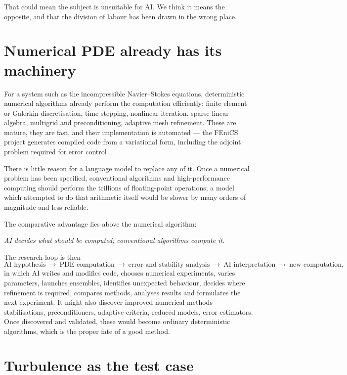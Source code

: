 \documentclass[11pt]{article}
\begin{document}
That could mean the subject is unsuitable for AI. We think it means the opposite, and that the
division of labour has been drawn in the wrong place.

\section{Numerical PDE already has its machinery}\label{sec:machinery}

For a system such as the incompressible Navier--Stokes equations, deterministic numerical algorithms
already perform the computation efficiently: finite element or Galerkin discretisation, time
stepping, nonlinear iteration, sparse linear algebra, multigrid and preconditioning, adaptive mesh
refinement. These are mature, they are fast, and their implementation is automated --- the FEniCS
project generates compiled code from a variational form, including the adjoint problem required for
error control~\cite{fenics}.

There is little reason for a language model to replace any of it. Once a numerical problem has been
specified, conventional algorithms and high-performance computing should perform the trillions of
floating-point operations; a model which attempted to do that arithmetic itself would be slower by
many orders of magnitude and less reliable.

The comparative advantage lies above the numerical algorithm:

\begin{center}
\emph{AI decides what should be computed; conventional algorithms compute it.}
\end{center}

\noindent The research loop is then
\[
\text{AI hypothesis}\ \rightarrow\ \text{PDE computation}\ \rightarrow\ \text{error and stability
analysis}\ \rightarrow\ \text{AI interpretation}\ \rightarrow\ \text{new computation},
\]
in which AI writes and modifies code, chooses numerical experiments, varies parameters, launches
ensembles, identifies unexpected behaviour, decides where refinement is required, compares methods,
analyses results and formulates the next experiment. It might also discover improved numerical
methods --- stabilisations, preconditioners, adaptive criteria, reduced models, error estimators.
Once discovered and validated, these would become ordinary deterministic algorithms, which is the
proper fate of a good method.

\section{Turbulence as the test case}\label{sec:turb}
\end{document}

